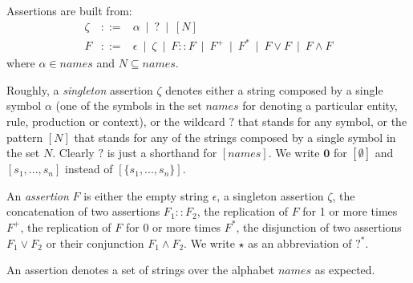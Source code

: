 \begin{definition}
\label{def:assetionl}
Assertions are built from: 
$$
\begin{array}{lcl}
\zeta & ::= & 
\alpha ~\mid ~ 
? ~\mid ~ 
[N]
\\
F & ::= & 
\epsilon ~\mid ~ 
\zeta ~\mid ~ 
F::F ~\mid ~ 
F^+ ~\mid ~ 
F^* ~\mid ~ 
F \vee F ~\mid ~ 
F \wedge F
\end{array}
$$
where $\alpha \in \mathit{names}$ and $N\subseteq \mathit{names}$.
\end{definition}

Roughly, a \emph{singleton} assertion $\zeta$ denotes either a string composed by a single symbol $\alpha$ (one of the symbols in the set $\mathit{names}$ for denoting a particular entity, rule, production or context), or
the wildcard $?$ that stands for any symbol, or the pattern $[N]$ that stands for any of the strings composed by a single symbol in the set $N$. Clearly $?$  is just a shorthand for $[\mathit{names}]$.
We write $\mathbf{0}$ for $[\emptyset]$ and $[s_1,...,s_n]$ instead of $[\{s_1,...,s_n\}]$. 

An \emph{assertion} $F$ is either the empty string $\epsilon$, a singleton assertion $\zeta$, the concatenation of two assertions $F_1::F_2$, the replication of $F$ for 1 or more times $F^+$, the replication of $F$ for 0 or more times $F^*$, the disjunction of two assertions $F_1 \vee F_2$ or their conjunction $F_1 \wedge F_2$. We write $\star$ as an abbreviation of $?^*$.

An assertion denotes a set of strings over the alphabet $\mathit{names}$ as expected.

